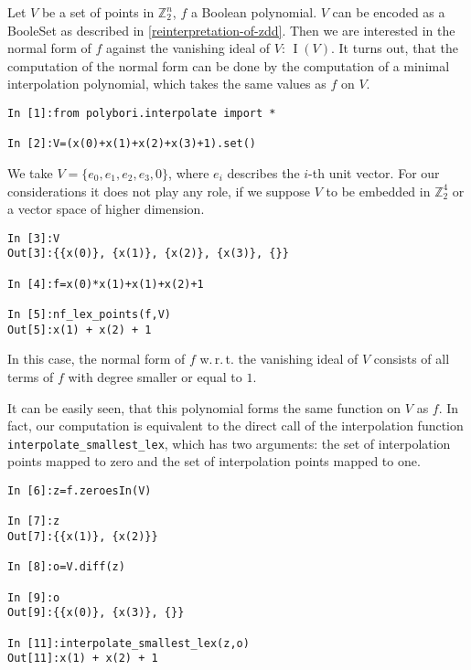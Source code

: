 \documentclass[]{article}
\DeclareMathOperator{\I}{I}
\newcommand{\Ztwo}{\mathbb{Z}_2}
\begin{document}
Let $V$ be a set of points in $\Ztwo^n$, $f$ a Boolean polynomial. $V$ can be encoded as a BooleSet as described in \ref{reinterpretation-of-zdd}.
Then we are interested in the normal form of $f$ against the vanishing ideal of $V$: $\I(V)$.
It turns out, that the computation of the normal form can be done by the computation of a minimal interpolation polynomial, which takes the same values as $f$ on $V$.

\begin{verbatim}
In [1]:from polybori.interpolate import *

In [2]:V=(x(0)+x(1)+x(2)+x(3)+1).set()
\end{verbatim}

We take $V=\{e_0,e_1,e_2,e_3,0\}$, where $e_i$ describes the $i$-th unit vector. For our considerations it does not play any role, if we suppose $V$ to be embedded in $\Ztwo^4$ or a vector space of higher dimension.

\begin{verbatim}
In [3]:V
Out[3]:{{x(0)}, {x(1)}, {x(2)}, {x(3)}, {}}

In [4]:f=x(0)*x(1)+x(1)+x(2)+1

In [5]:nf_lex_points(f,V)
Out[5]:x(1) + x(2) + 1
\end{verbatim}

In this case, the normal form of $f$ w.\,r.\,t. the vanishing ideal of $V$ consists of all terms of $f$ with degree smaller or equal to $1$.

It can be easily seen, that this polynomial forms the same function on $V$ as $f$.
In fact, our computation is equivalent to the direct call of the interpolation function \verb|interpolate_smallest_lex|, which has two arguments: the set of interpolation points mapped to zero and the set of interpolation points mapped to one.

\begin{verbatim}
In [6]:z=f.zeroesIn(V)

In [7]:z
Out[7]:{{x(1)}, {x(2)}}

In [8]:o=V.diff(z)

In [9]:o
Out[9]:{{x(0)}, {x(3)}, {}}

In [11]:interpolate_smallest_lex(z,o)
Out[11]:x(1) + x(2) + 1
\end{verbatim}



%

\end{document}

